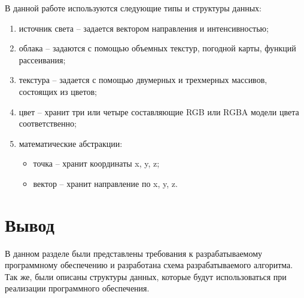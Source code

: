 В данной работе используются следующие типы и структуры данных:
\begin{enumerate}
	\item источник света -- задается вектором направления и интенсивностью;
	\item облака -- задаются с помощью объемных текстур, погодной карты, функций рассеивания;
	\item текстура -- задается с помощью двумерных и трехмерных массивов, состоящих из цветов;
	\item цвет -- хранит три или четыре составляющие RGB или RGBA модели цвета соответственно;
	\item математические абстракции: 
		\begin{itemize}
			\item точка -- хранит координаты x, y, z;
			\item вектор -- хранит направление по x, y, z.
		\end{itemize}
\end{enumerate}


\section*{Вывод}
В данном разделе были представлены требования к разрабатываемому
программному обеспечению и разработана схема разрабатываемого алгоритма.
Так же, были описаны структуры данных, которые будут использоваться при реализации программного обеспечения.


